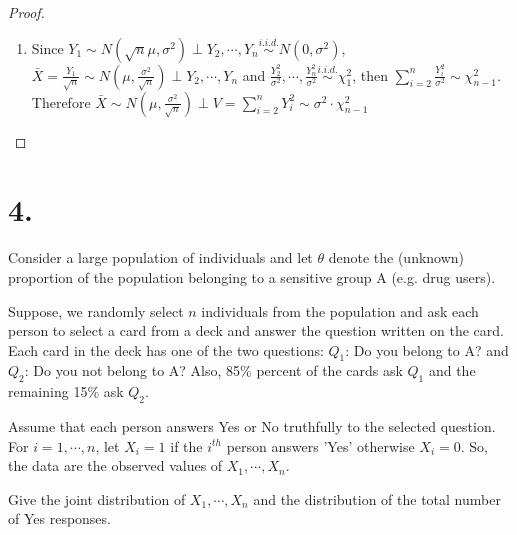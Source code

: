 \documentclass[a4paper, 11pt]{article}
\begin{document}
\begin{proof}
\begin{enumerate}[label=(\alph*)]
\begin{enumerate}[label=(\roman*)]
	\item Since $Y_1\sim N(\sqrt{n}\mu,\sigma^2 )\perp Y_2,\cdots,Y_n\stackrel{i.i.d.}{\sim}N(0,\sigma^2)$,  $\bar{X}=\frac{Y_1}{\sqrt{n}}\sim N\left(\mu,\frac{\sigma^2}{\sqrt{n}}\right)\perp Y_2,\cdots,Y_n$ and  $\frac{Y_2^2}{\sigma^2},\cdots,\frac{Y_n^2}{\sigma^2}\stackrel{i.i.d.}{\sim}\chi^2_1$, then $\sum_{i=2}^n \frac{Y_i^2}{\sigma^2}\sim\chi^2_{n-1}$. Therefore $\bar{X}\sim N\left(\mu,\frac{\sigma^2}{\sqrt{n}}\right)\perp V=\sum_{i=2}^n Y_i^2\sim \sigma^2\cdot\chi^2_{n-1}$
	
	
	
   \end{enumerate}
	\end{enumerate}



\end{proof}


\section*{4.} Consider a large population of individuals and let $\theta$ denote the (unknown) proportion of the population belonging to a sensitive group A (e.g. drug users).

Suppose, we randomly select $n$ individuals from the population and ask each person to select a card from a deck and answer the question written on the card. Each card in the deck has one of the two questions: $Q_1$: Do you belong to A? and $Q_2$: Do you not belong to A? Also, 85\% percent of the cards ask $Q_1$ and the remaining 15\% ask $Q_2$.

Assume that each person answers Yes or No truthfully to the selected question. For
$i = 1,\cdots,n$, let $X_i = 1$ if the $i^{th}$ person answers 'Yes' otherwise $X_i = 0$. So, the data are
the observed values of $X_1, \cdots,X_n$. 

Give the joint distribution of $X_1,\cdots,X_n$ and the distribution of the total number of
Yes responses.
\end{document}
